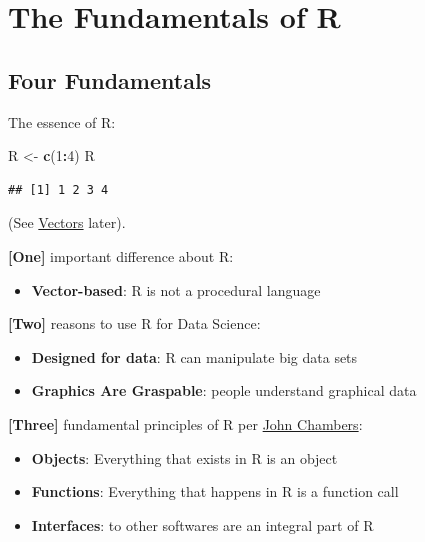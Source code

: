 \documentclass[]{book}
\newenvironment{Shaded}{\begin{snugshade}}{\end{snugshade}}
\newcommand{\DecValTok}[1]{\textcolor[rgb]{0.00,0.00,0.81}{#1}}
\newcommand{\KeywordTok}[1]{\textcolor[rgb]{0.13,0.29,0.53}{\textbf{#1}}}
\newcommand{\NormalTok}[1]{#1}
\newcommand{\OperatorTok}[1]{\textcolor[rgb]{0.81,0.36,0.00}{\textbf{#1}}}
\newcommand{\StringTok}[1]{\textcolor[rgb]{0.31,0.60,0.02}{#1}}
\providecommand{\tightlist}{%
  \setlength{\itemsep}{0pt}\setlength{\parskip}{0pt}}
\theoremstyle{definition}
\theoremstyle{definition}
\theoremstyle{definition}
\theoremstyle{remark}
\begin{document}
\hypertarget{the-fundamentals-of-r}{%
\chapter{The Fundamentals of R}\label{the-fundamentals-of-r}}

\hypertarget{four-fundamentals}{%
\section{Four Fundamentals}\label{four-fundamentals}}

The essence of R:

\begin{Shaded}
\begin{Highlighting}[]
\NormalTok{R <-}\StringTok{ }\KeywordTok{c}\NormalTok{(}\DecValTok{1}\OperatorTok{:}\DecValTok{4}\NormalTok{)}
\NormalTok{R}
\end{Highlighting}
\end{Shaded}

\begin{verbatim}
## [1] 1 2 3 4
\end{verbatim}

(See \protect\hyperlink{vectors}{Vectors} later).

\textbf{{[}One{]}} important difference about R:

\begin{itemize}
\tightlist
\item
  \textbf{Vector-based}: R is not a procedural language
\end{itemize}

\textbf{{[}Two{]}} reasons to use R for Data Science:

\begin{itemize}
\tightlist
\item
  \textbf{Designed for data}: R can manipulate big data sets
\item
  \textbf{Graphics Are Graspable}: people understand graphical data
\end{itemize}

\textbf{{[}Three{]}} fundamental principles of R per
\href{https://en.wikipedia.org/wiki/John_Chambers_(statistician)}{John
Chambers}:

\begin{itemize}
\tightlist
\item
  \textbf{Objects}: Everything that exists in R is an object
\item
  \textbf{Functions}: Everything that happens in R is a function call
\item
  \textbf{Interfaces}: to other softwares are an integral part of R
\end{itemize}
\end{document}
